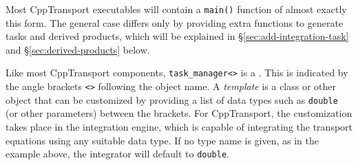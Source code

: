 \documentclass[11pt,a4paper]{article}
\newcounter{advancedbox}[section]
\newenvironment{advanced}[1]{\stepcounter{advancedbox}\begin{tcolorbox}[enhanced,breakable,colback=red!10,colbacktitle=red!20,colframe=red!40,coltitle=black,title={Advanced usage: {#1}},fonttitle=\sffamily\fontseries{b}\selectfont]}{\end{tcolorbox}}
\newcommand{\packagefont}{\sffamily}
\newcommand{\CppTransport}{{\packagefont CppTransport}}
\newcommand{\semibold}[1]{{\fontseries{b}\selectfont{#1}}}
\begin{document}
Most {\CppTransport} executables will contain a
\texttt{main()} function of almost exactly this form.
The general case differs only by providing extra functions
to generate tasks and derived products,
which will be explained in \S\ref{sec:add-integration-task}
and \S\ref{sec:derived-products}
below.

\begin{advanced}{Custom integration data types}
    \label{advanced:data-type}
    Like most {\CppTransport} components,
    \texttt{task_manager<>}
    is a \semibold{template class}. This is indicated by the
    angle brackets
    \texttt{<>} following the object name.
    A \emph{template} is a class or other object that can be customized
    by providing a list of data types 
    such as \texttt{double} (or other parameters)
    between the brackets.    
    For {\CppTransport}, the customization takes place in the integration engine,
    which is capable of integrating the transport equations using any
    suitable data type.
    If no type name is given, as in the example above,
    the integrator will default to
    \texttt{double}.
    

\end{advanced}
\end{document}
